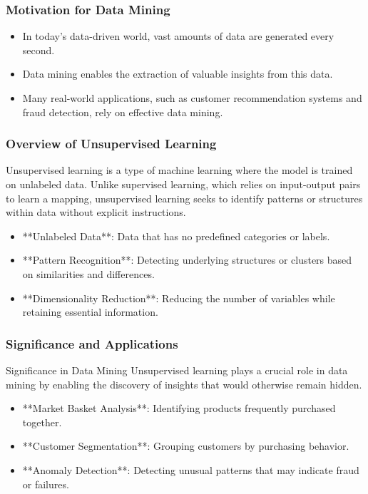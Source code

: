 \documentclass[aspectratio=169]{beamer}
\begin{document}
\frame{\titlepage}

\begin{frame}[fragile]
  \titlepage
\end{frame}

\begin{frame}[fragile]
  \frametitle{Motivation for Data Mining}
  
  \begin{itemize}
    \item In today's data-driven world, vast amounts of data are generated every second.
    \item Data mining enables the extraction of valuable insights from this data.
    \item Many real-world applications, such as customer recommendation systems and fraud detection, rely on effective data mining.
  \end{itemize}
  
\end{frame}

\begin{frame}[fragile]
  \frametitle{Overview of Unsupervised Learning}
  
  Unsupervised learning is a type of machine learning where the model is trained on unlabeled data. Unlike supervised learning, which relies on input-output pairs to learn a mapping, unsupervised learning seeks to identify patterns or structures within data without explicit instructions.

  \begin{itemize}
    \item **Unlabeled Data**: Data that has no predefined categories or labels.
    \item **Pattern Recognition**: Detecting underlying structures or clusters based on similarities and differences.
    \item **Dimensionality Reduction**: Reducing the number of variables while retaining essential information.
  \end{itemize}
  
\end{frame}

\begin{frame}[fragile]
  \frametitle{Significance and Applications}
  
  \begin{block}{Significance in Data Mining}
    Unsupervised learning plays a crucial role in data mining by enabling the discovery of insights that would otherwise remain hidden.
  \end{block}
  
  \begin{itemize}
    \item **Market Basket Analysis**: Identifying products frequently purchased together.
    \item **Customer Segmentation**: Grouping customers by purchasing behavior.
    \item **Anomaly Detection**: Detecting unusual patterns that may indicate fraud or failures.
  \end{itemize}

\end{frame}
\end{document}
